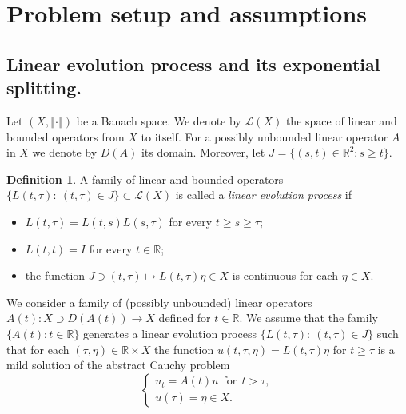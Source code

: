 \documentclass[a4paper,11pt,reqno]{amsart}
\theoremstyle{plain}
\theoremstyle{definition}
\newtheorem{defn}[lem]{Definition}
\numberwithin{equation}{section}
\newcommand{\R}{\mathbb{R}}
\newcommand{\norm}[1]{\left\Vert#1\right\Vert}
\renewcommand{\geq}{\geqslant}
\begin{document}
\section{Problem setup and assumptions}\label{sec:2}

\subsection{Linear evolution process and its exponential splitting.} Let $(X,\norm{\cdot})$ be a Banach space. We denote by $\mathcal{L}(X)$ the space of linear and bounded operators from $X$ to itself. For a possibly unbounded linear operator $A$ in $X$ we denote by $D(A)$ its domain. Moreover, let $J=\{ (s,t)\in \R^2\colon s\geq t\}$.

\begin{defn}
A family of linear and bounded operators $\{L(t,\tau)\colon \ (t,\tau)\in J\}\subset\mathcal{L}(X)$ is called a \textit{linear evolution process} if
	\begin{itemize}
		\item[(i)] $L(t,\tau) = L(t,s)L(s,\tau)$ for every $t\geq s\geq \tau$;
		\item[(ii)] $L(t,t) = I$ for every $t\in\R$;
		\item[(iii)] the function $J\ni (t,\tau)\mapsto L(t,\tau)\eta\in X$ is continuous for each $\eta\in X$.
	\end{itemize} 
\end{defn}
  We consider a family of (possibly unbounded) linear operators $A(t)\colon X\supset D(A(t))\to X$ defined for $t\in\R$. 
We assume that the family $\{A(t)\colon t\in\R\}$ generates a linear evolution process $\{L(t,\tau)\colon \ (t,\tau)\in J\}$ such that for each $(\tau,\eta)\in\R\times X$ the function $u(t,\tau,\eta)=L(t,\tau)\eta$ for $t\geq\tau$ is a mild solution of the abstract Cauchy problem   
\begin{equation}\label{e:LACP}
\begin{cases}
u_t=A(t)u\ \ \textrm{for}\ \  t>\tau,\\
u(\tau)=\eta\in X.
\end{cases}
\end{equation}
\end{document}
